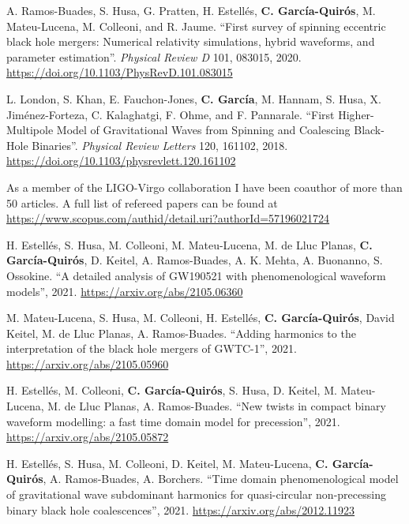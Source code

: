 \begin{cvpubs}
{\begin{cvetar}
       \item {A. Ramos-Buades, S. Husa, G. Pratten, H. Estellés, \textbf{C. García-Quirós}, M. Mateu-Lucena, M. Colleoni, and R. Jaume. ``First survey of spinning eccentric black hole mergers: Numerical relativity simulations, hybrid waveforms, and parameter estimation''. \textit{Physical Review D} 101, 083015, 2020. \url{https://doi.org/10.1103/PhysRevD.101.083015}}
       \item {L. London, S. Khan, E. Fauchon-Jones, \textbf{C. García}, M. Hannam, S. Husa, X. Jiménez-Forteza, C. Kalaghatgi, F. Ohme, and F. Pannarale. ``First Higher-Multipole Model of Gravitational Waves from Spinning and Coalescing Black-Hole Binaries''. \textit{Physical Review Letters} 120, 161102, 2018. \url{https://doi.org/10.1103/physrevlett.120.161102}}
       \item{As a member of the LIGO-Virgo collaboration I have been coauthor of more than 50 articles. A full list of refereed papers can be found at \url{https://www.scopus.com/authid/detail.uri?authorId=57196021724}}
      \end{cvetar}
    }
    
\end{cvpubs}\vspace{-10pt}

\begin{cvpubs}
  \cvpub
    {
      \begin{cvetar}
        \item {H. Estellés, S. Husa, M. Colleoni, M. Mateu-Lucena, M. de Lluc Planas, \textbf{C. García-Quirós}, D. Keitel, A. Ramos-Buades, A. K. Mehta, A. Buonanno, S. Ossokine. ``A detailed analysis of GW190521 with phenomenological waveform models'', 2021. \url{https://arxiv.org/abs/2105.06360}}
        \item {M. Mateu-Lucena, S. Husa, M. Colleoni, H. Estellés, \textbf{C. García-Quirós}, David Keitel, M. de Lluc Planas, A. Ramos-Buades. ``Adding harmonics to the interpretation of the black hole mergers of GWTC-1'', 2021. \url{https://arxiv.org/abs/2105.05960}}
        \item {H. Estellés, M. Colleoni, \textbf{C. García-Quirós}, S. Husa, D. Keitel, M. Mateu-Lucena, M. de Lluc Planas, A. Ramos-Buades. ``New twists in compact binary waveform modelling: a fast time domain model for precession'', 2021. \url{https://arxiv.org/abs/2105.05872}}
        \item {H. Estellés, S. Husa, M. Colleoni, D. Keitel, M. Mateu-Lucena, \textbf{C. García-Quirós}, A. Ramos-Buades, A. Borchers. ``Time domain phenomenological model of gravitational wave subdominant harmonics for quasi-circular non-precessing binary black hole coalescences'', 2021. \url{https://arxiv.org/abs/2012.11923}}
      \end{cvetar}
    }
\end{cvpubs}\vspace{-10pt}
